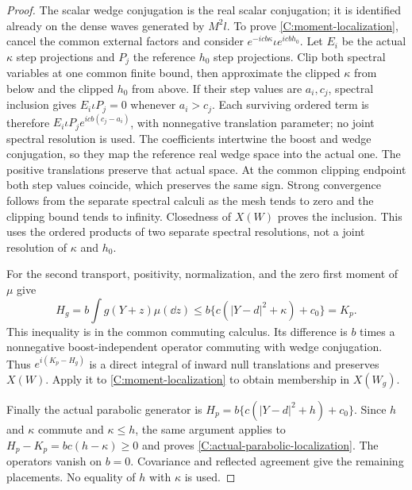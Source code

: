 \begin{proof}
The scalar wedge conjugation is the real scalar conjugation; it is
identified already on the dense waves generated by $M^2l$. To prove
\eqref{C:moment-localization}, cancel the common external factors and
consider $e^{-icb\kappa}\iota e^{icbh_0}$. Let $E_i$ be the
actual $\kappa$ step projections and $P_j$ the reference $h_0$ step
projections. Clip both spectral variables at one common finite bound,
then approximate the clipped
$\kappa$ from below and the clipped $h_0$ from above.  If their step
values are $a_i,c_j$, spectral inclusion gives
$E_i\iota P_j=0$ whenever $a_i>c_j$.  Each surviving ordered term is
therefore $E_i\iota P_j e^{icb(c_j-a_i)}$, with nonnegative
translation parameter; no joint spectral resolution is used.
The coefficients intertwine the boost and wedge conjugation, so
they map the reference real wedge space into the actual one.  The
positive translations preserve that actual space.  At the common
clipping endpoint both step values coincide, which preserves the
same sign.  Strong convergence follows from the separate spectral
calculi as the mesh tends to zero and the clipping bound tends to
infinity. Closedness of $X(W)$ proves the inclusion. This uses the
ordered products of two separate spectral resolutions, not a joint
resolution of $\kappa$ and $h_0$.

For the second transport, positivity, normalization, and the zero first
moment of $\mu$ give
\[
 H_g=b\int g(Y+z)\mu(\dd z)
 \le b\{c(|Y-d|^2+\kappa)+c_0\}=K_p.
\]
This inequality is in the common commuting calculus. Its difference
is $b$ times a nonnegative boost-independent operator commuting with
wedge conjugation. Thus $e^{i(K_p-H_g)}$ is a direct integral of
inward null translations and preserves $X(W)$. Apply it to
\eqref{C:moment-localization} to obtain membership in $X(W_g)$.

Finally the actual parabolic generator is
$H_p=b\{c(|Y-d|^2+h)+c_0\}$. Since $h$ and $\kappa$ commute and
$\kappa\le h$, the same argument applies to
$H_p-K_p=bc(h-\kappa)\ge0$ and proves
\eqref{C:actual-parabolic-localization}. The operators vanish on
$b=0$. Covariance and reflected agreement give the remaining placements.
No equality of $h$ with $\kappa$ is used.
\end{proof}

